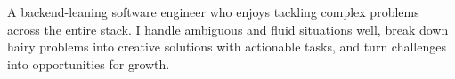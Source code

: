A backend-leaning software engineer who enjoys tackling complex problems across the entire stack.
I handle ambiguous and fluid situations well, break down hairy problems into creative solutions with actionable tasks,
and turn challenges into opportunities for growth.
